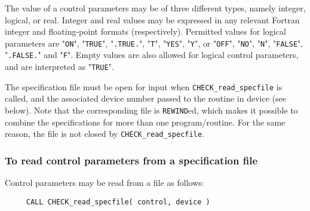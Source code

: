 \documentclass{galahad}
\newcommand{\packagename}{CHECK}
\begin{document}
The value of a control parameters may be of three different types, namely
integer, logical, or real.
Integer and real values may be expressed in any relevant Fortran integer and
floating-point formats (respectively). Permitted values for logical
parameters are "{\tt ON}", "{\tt TRUE}", "{\tt .TRUE.}", "{\tt T}", 
"{\tt YES}", "{\tt Y}", or "{\tt OFF}", "{\tt NO}",
"{\tt N}", "{\tt FALSE}", "{\tt .FALSE.}" and "{\tt F}". 
Empty values are also allowed for 
logical control parameters, and are interpreted as "{\tt TRUE}".  

The specification file must be open for 
input when {\tt \packagename\_read\_specfile}
is called, and the associated device number 
passed to the routine in device (see below). 
Note that the corresponding 
file is {\tt REWIND}ed, which makes it possible to combine the specifications 
for more than one program/routine.  For the same reason, the file is not
closed by {\tt \packagename\_read\_specfile}.

\subsubsection{To read control parameters from a specification file}
\label{readspec}

Control parameters may be read from a file as follows:
\hskip0.5in 
\def\baselinestretch{0.8} {\tt \begin{verbatim}
     CALL CHECK_read_specfile( control, device ) \end{verbatim}
}
\def\baselinestretch{1.0}
\end{document}
